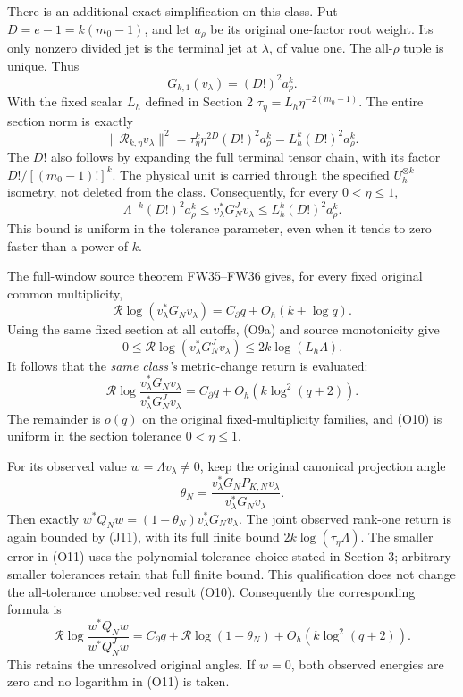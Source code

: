 There is an additional exact simplification on this class. Put \(D=e-1=k(m_0-1)\), and let \(a_\rho\) be its original one-factor root weight. Its only nonzero divided jet is the terminal jet at \(\lambda\), of value one. The all-\(\rho\) tuple is unique. Thus \[
 G_{k,1}(v_\lambda)=(D!)^2a_\rho^k.
\] With the fixed scalar \(L_h\) defined in Section 2 \(\tau_\eta=L_h\eta^{-2(m_0-1)}\). The entire section norm is exactly \[
 \|\mathcal R_{k,\eta}v_\lambda\|^2
 =\tau_\eta^k\eta^{2D}(D!)^2a_\rho^k
 =L_h^k(D!)^2a_\rho^k.
\] The \(D!\) also follows by expanding the full terminal tensor chain, with its factor \(D!/[(m_0-1)!]^k\). The physical unit is carried through the specified \(U_h^{\otimes k}\) isometry, not deleted from the class. Consequently, for every \(0<\eta\le1\), \[
 \boxed{
 \Lambda^{-k}(D!)^2a_\rho^k
 \le v_\lambda^*G_N^Jv_\lambda
 \le L_h^k(D!)^2a_\rho^k.
 } \tag{O9a}
\] This bound is uniform in the tolerance parameter, even when it tends to zero faster than a power of \(k\).

The full-window source theorem FW35--FW36 gives, for every fixed original common multiplicity, \[
 \mathcal R\log(v_\lambda^*G_Nv_\lambda)
 =C_\partial q+O_h(k+\log q). \tag{O9}
\] Using the same fixed section at all cutoffs, (O9a) and source monotonicity give \[
 0\le\mathcal R\log(v_\lambda^*G_N^Jv_\lambda)
 \le2k\log(L_h\Lambda).
\] It follows that the \emph{same class's} metric-change return is evaluated: \[
 \boxed{
 \mathcal R\log
 \frac{v_\lambda^*G_Nv_\lambda}
      {v_\lambda^*G_N^Jv_\lambda}
 =C_\partial q+O_h(k\log^2(q+2)).
 } \tag{O10}
\] The remainder is \(o(q)\) on the original fixed-multiplicity families, and (O10) is uniform in the section tolerance \(0<\eta\le1\).

For its observed value \(w=\Lambda v_\lambda\ne0\), keep the original canonical projection angle \[
 \theta_N=\frac{v_\lambda^*G_NP_{K,N}v_\lambda}
 {v_\lambda^*G_Nv_\lambda}.
\] Then exactly \(w^*Q_Nw=(1-\theta_N)v_\lambda^*G_Nv_\lambda\). The joint observed rank-one return is again bounded by (J11), with its full finite bound \(2k\log(\tau_\eta\Lambda)\). The smaller error in (O11) uses the polynomial-tolerance choice stated in Section 3; arbitrary smaller tolerances retain that full finite bound. This qualification does not change the all-tolerance unobserved result (O10). Consequently the corresponding formula is \[
 \boxed{
 \mathcal R\log\frac{w^*Q_Nw}{w^*Q_N^Jw}
 =C_\partial q+\mathcal R\log(1-\theta_N)
 +O_h(k\log^2(q+2)).
 } \tag{O11}
\] This retains the unresolved original angles. If \(w=0\), both observed energies are zero and no logarithm in (O11) is taken.

